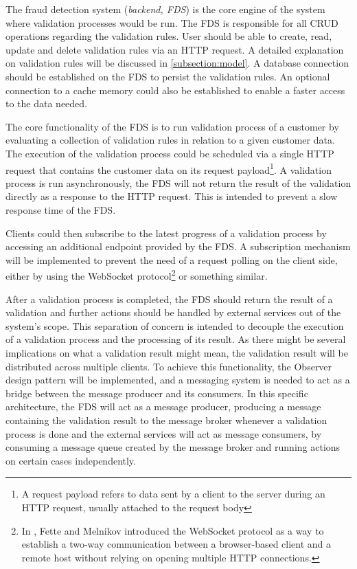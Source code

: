 The fraud detection system (\emph{backend, FDS}) is the core engine of the system where validation processes would be run. The FDS is responsible for all CRUD operations regarding the validation rules. User should be able to create, read, update and delete validation rules via an HTTP request. A detailed explanation on validation rules will be discussed in \autoref{subsection:model}. A database connection should be established on the FDS to persist the validation rules. An optional connection to a cache memory could also be established to enable a faster access to the data needed.

The core functionality of the FDS is to run validation process of a customer by evaluating a collection of validation rules in relation to a given customer data. The execution of the validation process could be scheduled via a single HTTP request that contains the customer data on its request payload\footnote{A request payload refers to data sent by a client to the server during an HTTP request, usually attached to the request body\autocite[section \enquote{7.2 Enity Body}]{rfc1945}}. A validation process is run asynchronously, the FDS will not return the result of the validation directly as a response to the HTTP request. This is intended to prevent a slow response time of the FDS. 

Clients could then subscribe to the latest progress of a validation process by accessing an additional endpoint provided by the FDS. A subscription mechanism will be implemented to prevent the need of a request polling on the client side, either by using the WebSocket protocol\footnote{In \autocite{rfc6455}, Fette and Melnikov introduced the WebSocket protocol as a way to establish a two-way communication between a browser-based client and a remote host without relying on opening multiple HTTP connections.} or something similar. 

After a validation process is completed, the FDS should return the result of a validation and further actions should be handled by external services out of the system's scope. This separation of concern is intended to decouple the execution of a validation process and the processing of its result. As there might be several implications on what a validation result might mean, the validation result will be distributed across multiple clients. To achieve this functionality, the Observer\autocite[pp. 293-303]{gamma-1995} design pattern will be implemented, and a messaging system is needed to act as a bridge between the message producer and its consumers. In this specific architecture, the FDS will act as a message producer, producing a message containing the validation result to the message broker whenever a validation process is done and the external services will act as message consumers, by consuming a message queue created by the message broker and running actions on certain cases independently.